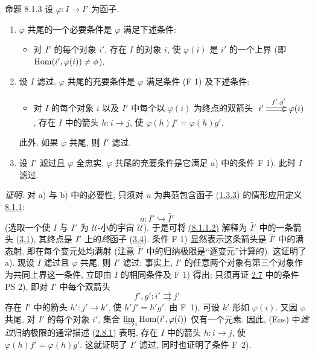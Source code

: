 \begin{enonce*}{命题 8.1.3}
设 $\varphi:I\rightarrow I'$ 为函子.
\begin{enumerate}
\renewcommand{\theenumi}{\alph{enumi}}
\renewcommand{\labelenumi}{\theenumi)}
\item $\varphi$ 共尾的一个必要条件是 $\varphi$ 满足下述条件:

\begin{itemize}
\item[F 1)] 对 $I'$ 的每个对象 $i'$, 存在 $I$ 的对象 $i$, 使
$\varphi(i)$ 是 $i'$ 的一个上界 (即 $\operatorname{Hom}(i',\varphi(i))\neq \phi$).
\end{itemize}

\item 设 $I$ 滤过. $\varphi$ 共尾的充要条件是 $\varphi$ 满足条件
{\rm (F 1)} 及下述条件:
\begin{itemize}
\item[F 2)] 对 $I$ 的每个对象 $i$ 以及 $I'$ 中每个以 $\varphi(i)$ 为终点的双箭头
$\xymatrix{ i'\ar@<2pt>[r]^{f',g'}\ar@<-2pt>[r]& \varphi(i) }$,
存在 $I$ 中的箭头 $h:i\rightarrow j$, 使 $\varphi(h)f'=\varphi(h)g'$.
\end{itemize}
此外, 如果 $\varphi$ 共尾, 则 $I'$ 滤过.

\item 设 $I'$ 滤过且 $\varphi$ 全忠实. $\varphi$ 共尾的充要条件是它满足
{\rm a)} 中的条件 {\rm F 1)}. 此时 $I$ 滤过.
\end{enumerate}
\end{enonce*}

\noindent \emph{证明.} 对 a) 与 b) 中的必要性, 只须对 $u$ 为典范包含函子
(\hyperref[I.sec1.3.3]{1.3.3}) 的情形应用定义 \hyperref[I.def8.1.1]{8.1.1}:
$$
u:I'\hookrightarrow \widehat{I}'
$$
(选取一个使 $I$ 与 $I'$ 为 $𝒰$-小的宇宙 $𝒰$).
于是可将 \hyperlink{sga4.exp.I.equation.8.1.1.2}{(8.1.1.2)} 解释为
$\widehat{I}'$ 中的一条箭头 (\hyperref[I.prop3.1]{3.1}), 其终点是
$I'$ 上的\emph{终}\pageoriginale{}函子 (\hyperref[I.prop3.4]{3.4}).
条件 F 1) 显然表示这条箭头是 $\widehat{I}'$ 中的满态射, 即在每个变元处均满射
(注意 $\widehat{I}'$ 中的归纳极限是“逐变元”计算的). 这证明了 a).
现设 $I$ 滤过且 $\varphi$ 共尾. 则 $I'$ 滤过: 事实上,
$I'$ 的任意两个对象有第三个对象作为共同上界这一条件, 立即由 $I$ 的相同条件及 F 1) 得出;
只须再证 \hyperref[I.def2.7]{2.7} 中的条件 PS 2), 即对 $I'$ 中每个双箭头
$$
f',g':i'\rightrightarrows j'
$$
存在 $I'$ 中的箭头 $h':j'\rightarrow k'$, 使 $h'f'=h'g'$.
由 F~1), 可设 $k'$ 形如 $\varphi(i)$. 又因 $\varphi$ 共尾, 对 $I'$ 的每个对象 $i'$,
集合 $\varinjlim_i\operatorname{Hom}(i',\varphi(i))$ 仅有一个元素.
因此, (Ens) 中\emph{滤过}归纳极限的通常描述
(\hyperref[I.lem2.8.1]{2.8.1}) 表明, 存在 $I$ 中的箭头 $h:i\rightarrow j$,
使 $\varphi(h)f'=\varphi(h)g'$. 这就证明了 $I'$ 滤过, 同时也证明了条件 F~2).

